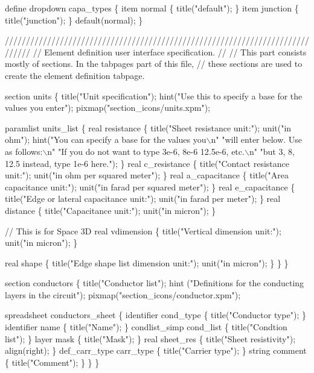 define dropdown capa_types \{
    item normal \{ title("default"); \}
    item junction \{ title("junction"); \}
    default(normal);
\}


//////////////////////////////////////////////////////////////////////////////
// Element definition user interface specification.
//
// This part consists mostly of sections. In the tabpages part of this file,
// these sections are used to create the element definition tabpage.

section units \{
    title("Unit specification");
    hint("Use this to specify a base for the values you enter");
    pixmap("section_icons/units.xpm");

    paramlist units_list \{
        real resistance \{
            title("Sheet resistance unit:");
            unit("in ohm");
            hint("You can specify a base for the values you\(\backslash\)n"
                 "will enter below. Use as follows:\(\backslash\)n"
                 "If you do not want to type 3e-6, 8e-6 12.5e-6, etc.\(\backslash\)n"
                 "but 3, 8, 12.5 instead, type 1e-6 here.");
        \}
        real c_resistance \{
            title("Contact resistance unit:");
            unit("in ohm per squared meter");
        \}
        real a_capacitance \{
            title("Area capacitance unit:");
            unit("in farad per squared meter");
        \}
        real e_capacitance \{
            title("Edge or lateral capacitance unit:");
            unit("in farad per meter");
        \}
        real distance \{
            title("Capacitance unit:");
            unit("in micron");
        \}

        // This is for Space 3D
        real vdimension \{
            title("Vertical dimension unit:");
            unit("in micron");
        \}

        real shape \{
            title("Edge shape list dimension unit:");
            unit("in micron");
        \}
    \}
\}

section conductors \{
    title("Conductor list");
    hint ("Definitions for the conducting layers in the circuit");
    pixmap("section_icons/conductor.xpm");

    spreadsheet conductors_sheet \{
        identifier      cond_type \{ title("Conductor type"); \}
        identifier      name \{ title("Name"); \}
        condlist_simp   cond_list \{ title("Condtion list"); \}
        layer           mask \{ title("Mask"); \}
        real            sheet_res \{
                            title("Sheet resistivity");
                            align(right);
                        \}
        def_carr_type   carr_type \{ title("Carrier type"); \}
        string          comment \{ title("Comment"); \}
    \}
\}

